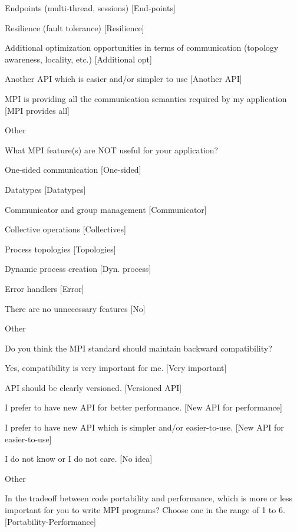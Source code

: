 \documentclass[preprint,5p,times]{elsarticle}
\begin{document}
{\begin{description}
\begin{inparaenum}[{\bf C}1)]
    \item Endpoints (multi-thread, sessions) [End-points]
    \item Resilience (fault tolerance) [Resilience]
    \item Additional optimization opportunities in terms of communication
      (topology awareness, locality, etc.) [Additional opt]
    \item Another API which is easier and/or simpler to use [Another API]
    \item MPI is providing all the communication semantics required by my
      application [MPI provides all]
    \item Other
    \end{inparaenum}
  \item[Q27*:] What MPI feature(s) are NOT useful for your application?
    \begin{inparaenum}[{\bf C}1)]
    \item One-sided communication [One-sided]
    \item Datatypes [Datatypes]
    \item Communicator and group management [Communicator]
    \item Collective operations [Collectives]
    \item Process topologies [Topologies]
    \item Dynamic process creation [Dyn. process]
    \item Error handlers [Error]
    \item There are no unnecessary features [No]
    \item Other
    \end{inparaenum}
  \item[Q28:] Do you think the MPI standard should maintain backward
    compatibility?
    \begin{inparaenum}[{\bf C}1)]
    \item Yes, compatibility is very important for me. [Very important]
    \item API should be clearly versioned. [Versioned API]
    \item I prefer to have new API for better performance. [New API for performance]
    \item I prefer to have new API which is simpler and/or
      easier-to-use. [New API for easier-to-use]
    \item I do not know or I do not care. [No idea]
    \item Other
    \end{inparaenum}
  \item[Q29:] In the tradeoff between code portability and performance,
    which is more or less important for you to write MPI programs?
    Choose one in the range of 1 to 6. [Portability-Performance]
  \end{description}
}
\end{document}

